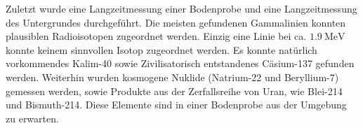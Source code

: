 Zuletzt wurde eine Langzeitmessung einer Bodenprobe und eine Langzeitmessung des Untergrundes durchgeführt. Die meisten gefundenen Gammalinien konnten plausiblen Radioisotopen zugeordnet werden. Einzig eine Linie bei ca. $\SI{1.9}{\mega\electronvolt}$ konnte keinem sinnvollen Isotop zugeordnet werden. Es konnte natürlich vorkommendes Kalim-40 sowie Zivilisatorisch entstandenes Cäsium-137 gefunden werden. Weiterhin wurden kosmogene Nuklide (Natrium-22 und Beryllium-7) gemessen werden, sowie Produkte aus der Zerfallsreihe von Uran, wie Blei-214 und Bismuth-214. Diese Elemente sind in einer Bodenprobe aus der Umgebung zu erwarten.
